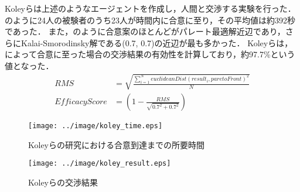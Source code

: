 Koleyらは上述のようなエージェントを作成し，人間と交渉する実験を行った．
のように24人の被験者のうち23人が時間内に合意に至り，その平均値は約392秒であった．
また，のように合意案のほとんどがパレート最適解近辺であり，さらにKalai-Smorodinsky解である(0.7, 0.7)の近辺が最も多かった．
Koleyらは，によって合意に至った場合の交渉結果の有効性を計算しており，約97.7\%という値となった．
\begin{align}
    RMS &= \sqrt{\frac{\sum_{i=1}^N euclideanDist(result_i, paretoFront)^2}{N}} \label{eq:rms} \\
    \mathit{EfficacyScore} &= \left( 1 - \frac{RMS}{\sqrt{0.7^2 + 0.7^2}} \right) \label{eq:efficient}
\end{align}

\begin{figure}[bt]
    \centering
    \texttt{[image: ../image/koley\_time.eps]}
    \caption[Koleyらの研究における合意到達までの所要時間]{Koleyらの研究における合意到達までの所要時間 \protect \footnotemark}
    \label{fig:koley_time}
\end{figure}

\clearpage

\begin{figure}[!tb]
    \centering
    \texttt{[image: ../image/koley\_result.eps]}
    \caption[Koleyらの交渉結果]{Koleyらの交渉結果 \protect \footnotemark}
    \label{fig:koley_result}
\end{figure}

